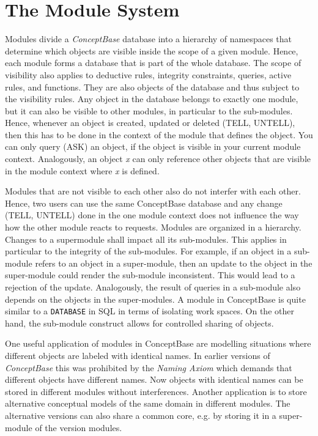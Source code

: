 \chapter{The Module System}
\label{sec:module}




Modules divide a {\em ConceptBase} database into
a hierarchy of namespaces that determine which objects are visible
inside the scope of a given module. Hence, each module forms a database that is part
of the whole database.
The scope of visibility also applies to  deductive rules, integrity constraints,
queries, active rules, and functions. They are also objects of the database and thus subject
to the visibility rules. Any object in the database belongs to exactly one module,
but it can also be visible to other modules, in particular to the sub-modules. 
Hence, whenever an object is created, updated or deleted (TELL, UNTELL), then
this has to be done in the context of the module that defines the object.
You can only query (ASK) an object, if the object is visible in your current
module context. Analogously, an object {\em x\/} can only reference other objects that are visible
in the module context where {\em x\/} is defined.

Modules that are not visible to each other also do not interfer with each other.
Hence, two users can use the same ConceptBase database and any change (TELL, UNTELL) done in 
the one module context does not influence the way how the other module reacts to requests.
Modules are organized in a hierarchy.
Changes to a supermodule shall impact all its sub-modules. This applies in particular to
the integrity of the sub-modules. For example, if an object in a sub-module refers to an object in
a super-module, then an update to the object in the super-module could render the sub-module
inconsistent. This would lead to a rejection of the update. Analogously, the result of
queries in a sub-module also depends on the objects in the super-modules. A module
in ConceptBase is quite similar to a {\tt DATABASE} in SQL in terms of isolating 
work spaces. On the other hand, the sub-module construct allows for controlled sharing of objects.

One useful application of modules in ConceptBase are modelling situations where different
objects are labeled with identical names. In earlier versions of {\em ConceptBase} this was
prohibited by the {\em Naming Axiom} which demands that different objects have different names.
Now objects with identical names can be stored in different modules without interferences.
Another application is to store alternative conceptual models of the same
domain in different modules. The alternative versions can also share a common core, e.g.
by storing it in a super-module of the version modules.

